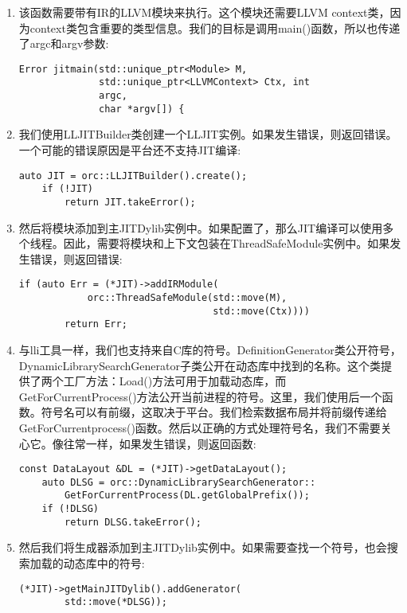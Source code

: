 \begin{enumerate}
\item 该函数需要带有IR的LLVM模块来执行。这个模块还需要LLVM context类，因为context类包含重要的类型信息。我们的目标是调用main()函数，所以也传递了argc和argv参数:
\begin{lstlisting}[caption={}]
Error jitmain(std::unique_ptr<Module> M,
			  std::unique_ptr<LLVMContext> Ctx, int 
			  argc,
			  char *argv[]) {
\end{lstlisting}

\item 我们使用LLJITBuilder类创建一个LLJIT实例。如果发生错误，则返回错误。一个可能的错误原因是平台还不支持JIT编译:
\begin{lstlisting}[caption={}]
	auto JIT = orc::LLJITBuilder().create();
	if (!JIT)
		return JIT.takeError();
\end{lstlisting}

\item 然后将模块添加到主JITDylib实例中。如果配置了，那么JIT编译可以使用多个线程。因此，需要将模块和上下文包装在ThreadSafeModule实例中。如果发生错误，则返回错误:
\begin{lstlisting}[caption={}]
	if (auto Err = (*JIT)->addIRModule(
			orc::ThreadSafeModule(std::move(M),
								  std::move(Ctx))))
		return Err;
\end{lstlisting}

\item 与lli工具一样，我们也支持来自C库的符号。DefinitionGenerator类公开符号，DynamicLibrarySearchGenerator子类公开在动态库中找到的名称。这个类提供了两个工厂方法：Load()方法可用于加载动态库，而GetForCurrentProcess()方法公开当前进程的符号。这里，我们使用后一个函数。符号名可以有前缀，这取决于平台。我们检索数据布局并将前缀传递给GetForCurrentprocess()函数。然后以正确的方式处理符号名，我们不需要关心它。像往常一样，如果发生错误，则返回函数:
\begin{lstlisting}[caption={}]
	const DataLayout &DL = (*JIT)->getDataLayout();
	auto DLSG = orc::DynamicLibrarySearchGenerator::
		GetForCurrentProcess(DL.getGlobalPrefix());
	if (!DLSG)
		return DLSG.takeError();
\end{lstlisting}

\item 然后我们将生成器添加到主JITDylib实例中。如果需要查找一个符号，也会搜索加载的动态库中的符号:
\begin{lstlisting}[caption={}]
	(*JIT)->getMainJITDylib().addGenerator(
		std::move(*DLSG));
\end{lstlisting}


\end{enumerate}

